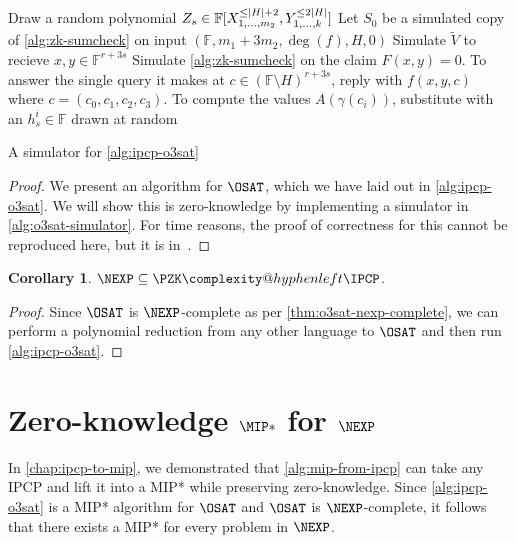 \documentclass[english,12pt]{reedthesis}
\makeatletter
\theoremstyle{plain}
\newtheorem{cor}[cor]{Corollary}
\theoremstyle{definition}
\theoremstyle{remark}
\DeclarePairedDelimiter{\abs}{\lvert}{\rvert}
\newcommand{\PZKIPCP}{%
  \PZK\complexity@hyphenleft\IPCP
}
\makeatother
\begin{document}
\begin{algorithm}[htbp]
  Draw a random polynomial
  $Z_{s} \in \mathbb{F}[X_{1, \ldots, m_{2}}^{\le \abs{H}+2}, Y_{1, \ldots, k}^{\le 2\abs{H}}]$\;
  Let $S_{0}$ be a simulated copy of \cref{alg:zk-sumcheck} on input
  $(\mathbb{F}, m_{1} + 3m_{2}, \deg(f), H, 0)$\;
  Simulate $\tilde{V}$ to recieve $x, y \in \mathbb{F}^{r + 3s}$\;
  Simulate \cref{alg:zk-sumcheck} on the claim $F(x, y) = 0$. To answer the
  single query it makes at $c \in (\mathbb{F} \setminus H)^{r+3s}$, reply with
  $f(x, y, c)$ where $c = (c_{0}, c_{1}, c_{2}, c_{3})$. To compute the values
  $A(\gamma(c_{i}))$, substitute with an $h_{s}^{i} \in \mathbb{F}$ drawn at random\;
  \caption{A simulator for \cref{alg:ipcp-o3sat}~\cite[p.\ 15.37]{CFGS22}}\label{alg:o3sat-simulator}
\end{algorithm}

\begin{proof}
  We present an algorithm for $\OSAT$, which we have laid out in
  \cref{alg:ipcp-o3sat}. We will show this is zero-knowledge by implementing a
  simulator in \cref{alg:o3sat-simulator}. For time reasons, the proof of
  correctness for this cannot be reproduced here, but it is in~\cite[Theorem
  14.2]{CFGS22}.
\end{proof}

\begin{cor}\label{nexp-pzkipcp}
  $\NEXP \subseteq \PZKIPCP$.
\end{cor}

\begin{proof}
  Since $\OSAT$ is $\NEXP$-complete as per \cref{thm:o3sat-nexp-complete}, we
  can perform a polynomial reduction from any other language to $\OSAT$ and then
  run \cref{alg:ipcp-o3sat}.
\end{proof}

\section{Zero-knowledge $\MIP*$ for $\NEXP$}\label{sec:zk-mipstar-nexp}

In \cref{chap:ipcp-to-mip}, we demonstrated that \cref{alg:mip-from-ipcp} can
take any IPCP and lift it into a MIP* while preserving zero-knowledge. Since
\cref{alg:ipcp-o3sat} is a MIP* algorithm for $\OSAT$ and $\OSAT$ is
$\NEXP$-complete, it follows that there exists a MIP* for every problem in
$\NEXP$.
\end{document}
